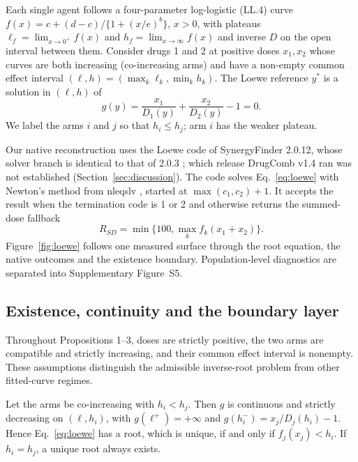 \documentclass[11pt]{article}
\begin{document}
Each single agent follows a four-parameter log-logistic (LL.4) curve $f(x)=c+(d-c)/\{1+(x/e)^{b}\}$, $x>0$, with plateaus $\ell_f=\lim_{x\to0^+}f(x)$ and $h_f=\lim_{x\to\infty}f(x)$ and inverse $D$ on the open interval between them. Consider drugs 1 and 2 at positive doses $x_1,x_2$ whose curves are both increasing (co-increasing arms) and have a non-empty common effect interval $(\ell,h)=(\max_k\ell_k,\min_kh_k)$. The Loewe reference $y^*$ is a solution in $(\ell,h)$ of
\begin{equation}\label{eq:loewe}
g(y)=\frac{x_1}{D_1(y)}+\frac{x_2}{D_2(y)}-1=0 .
\end{equation}
We label the arms $i$ and $j$ so that $h_i\le h_j$; arm $i$ has the weaker plateau.

Our native reconstruction uses the Loewe code of SynergyFinder 2.0.12, whose solver branch is identical to that of 2.0.3 \citep{synergyfinder_source}; which release DrugComb v1.4 ran was not established (Section~\ref{sec:discussion}). The code solves Eq.~\eqref{eq:loewe} with Newton's method from nleqslv \citep{hasselman_nleqslv}, started at $\max(c_1,c_2)+1$. It accepts the result when the termination code is 1 or 2 and otherwise returns the summed-dose fallback
\begin{equation}\label{eq:rsd}
R_{SD}=\min\{100,\max_k f_k(x_1+x_2)\}.
\end{equation}
Figure~\ref{fig:loewe} follows one measured surface through the root equation, the native outcomes and the existence boundary. Population-level diagnostics are separated into Supplementary Figure~S5.

\subsection{Existence, continuity and the boundary layer}
Throughout Propositions 1–3, doses are strictly positive, the two arms are compatible and strictly increasing, and their common effect interval is nonempty. These assumptions distinguish the admissible inverse-root problem from other fitted-curve regimes.

\begin{proposition}\label{prop:existence}
Let the arms be co-increasing with $h_i<h_j$. Then $g$ is continuous and strictly decreasing on $(\ell,h_i)$, with $g(\ell^+)=+\infty$ and $g(h_i^-)=x_j/D_j(h_i)-1$. Hence Eq.~\eqref{eq:loewe} has a root, which is unique, if and only if $f_j(x_j)<h_i$. If $h_i=h_j$, a unique root always exists.
\end{proposition}
\end{document}
